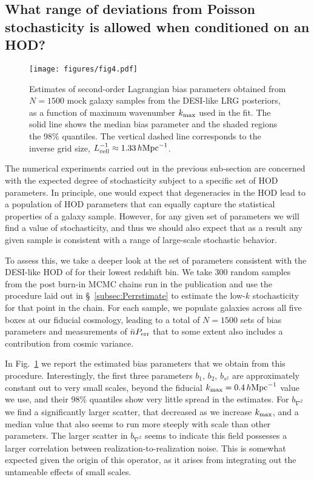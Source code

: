 \documentclass[fleqn,usenatbib]{mnras}
\newcommand{\ihmpc}{\,h{\rm Mpc}^{-1}}
\begin{document}
\subsection{What range of deviations from Poisson stochasticity is allowed when conditioned on an HOD?}
\label{subsec:chainhod}
\begin{figure}
    \centering
    \texttt{[image: figures/fig4.pdf]}
    \caption{Estimates of second-order Lagrangian bias parameters obtained from $N=1500$ mock galaxy samples from the DESI-like LRG posteriors, as a function of maximum wavenumber $k_{\rm max}$ used in the fit. The solid line shows the median bias parameter and the shaded regions the 98\% quantiles. The vertical dashed line corresponds to the inverse grid size, $L_{\rm cell}^{-1} \approx 1.33 \ihmpc$.}
    \label{fig:hodchainbias} 
\end{figure}
The numerical experiments carried out in the previous sub-section are concerned with the expected degree of stochasticity subject to a specific set of HOD parameters. In principle, one would expect that degeneracies in the HOD lead to a population of HOD parameters that can equally capture the statistical properties of a galaxy sample. However, for any given set of parameters we will find a value of stochasticity, and thus we should also expect that as a result any given sample is consistent with a range of large-scale stochastic behavior. \par 
To assess this, we take a deeper look at the set of parameters consistent with the DESI-like HOD of \cite{Zhou_2020} for their lowest redshift bin. We take 300 random samples from the post burn-in MCMC chains run in the publication and use the procedure laid out in \S~\ref{subsec:Perrstimate} to estimate the low-$k$ stochasticity for that point in the chain. For each sample, we populate galaxies across all five boxes at our fiducial cosmology, leading to a total of $N=1500$ sets of bias parameters and measurements of $\bar{n}P_{\rm err}$ that to some extent also includes a contribution from cosmic variance. \par 
In Fig.~\ref{fig:hodchainbias} we report the estimated bias parameters that we obtain from this procedure. Interestingly, the first three parameters $b_1, \, b_2, \, b_{s^2}$ are approximately constant out to very small scales, beyond the fiducial $k_{\rm max} = 0.4 \ihmpc$ value we use, and their 98\% quantiles show very little spread in the estimates. For $b_{\nabla^2}$ we find a significantly larger scatter, that decreased as we increase $k_{\rm max}$, and a median value that also seems to run more steeply with scale than other parameters. The larger scatter in $b_{\nabla^2}$ seems to indicate this field possesses a larger correlation between realization-to-realization noise. This is somewhat expected given the origin of this operator, as it arises from integrating out the untameable effects of small scales. \par 
\end{document}
